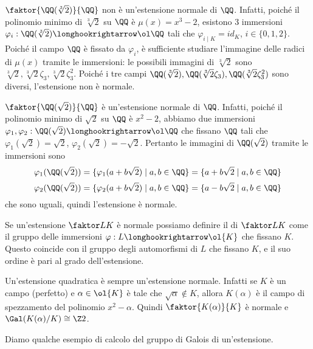\documentclass[11pt]{scrartcl}
\begin{document}
\begin{example}
    $\faktor{\QQ(\sqrt[3]{2})}{\QQ}$ non è un'estensione normale di $\QQ$.
    Infatti, poiché il polinomio minimo di $\sqrt[3]{2}$ su $\QQ$ è $\mu(x) = x^3 - 2$,
    esistono 3 immersioni $\varphi_i: \QQ(\sqrt[3]{2})\longhookrightarrow \ol\QQ$
    tali che $\varphi_{i\mid K} = id_K$, $i \in \{0, 1, 2\}$. Poiché il campo
    $\QQ$ è fissato da $\varphi_i$, è sufficiente studiare l'immagine delle
    radici di $\mu(x)$ tramite le immersioni: le possibili immagini di $\sqrt[3]{2}$
    sono $\sqrt[3]{2}, \sqrt[3]{2}\zeta_3, \sqrt[3]{2}\zeta_3^2$. Poiché i 
    tre campi $\QQ(\sqrt[3]{2}), \QQ(\sqrt[3]{2}\zeta_3), \QQ(\sqrt[3]{2}\zeta_3^2)$
    sono diversi, l'estensione non è normale.
\end{example}

\begin{example}
    $\faktor{\QQ(\sqrt{2})}{\QQ}$ è un'estensione normale di $\QQ$. Infatti,
    poiché il polinomio minimo di $\sqrt{2}$ su $\QQ$ è $x^2 - 2$, abbiamo 
    due immersioni $\varphi_1, \varphi_2:\QQ(\sqrt{2})\longhookrightarrow \ol\QQ$
    che fissano $\QQ$ tali che $\varphi_1(\sqrt{2}) = \sqrt{2}$, 
    $\varphi_2(\sqrt{2}) = -\sqrt{2}$. Pertanto le immagini di $\QQ(\sqrt 2)$
    tramite le immersioni sono
    \[
        \varphi_1(\QQ(\sqrt 2)) = \{\varphi_1(a + b\sqrt 2)\mid a, b \in \QQ\} = 
        \{a + b\sqrt 2\mid a, b \in \QQ\}
    \]
    \[
        \varphi_2(\QQ(\sqrt 2)) = \{\varphi_2(a + b\sqrt 2)\mid a, b \in \QQ\} = 
        \{a - b\sqrt 2 \mid a, b \in \QQ\}
    \]
    che sono uguali, quindi l'estensione è normale.
\end{example}

Se un'estensione $\faktor L K$ è normale possiamo definire il 
di $\faktor L K$ come il gruppo delle immersioni $\varphi:L\longhookrightarrow \ol{K}$
che fissano $K$. Questo coincide con il gruppo degli automorfismi di $L$
che fissano $K$, e il suo ordine è pari al grado dell'estensione.

\begin{remark}
    Un'estensione quadratica è sempre un'estensione normale. Infatti se $K$ 
    è un campo (perfetto) e $\alpha \in \ol{K}$ è tale che $\sqrt{\alpha}\notin K$,
    allora $K(\alpha)$ è il campo di spezzamento del polinomio $x^2 - \alpha$.
    Quindi $\faktor{K(\alpha)}{K}$ è normale e $\Gal(K(\alpha)/K) \cong \Z2$.
\end{remark}

Diamo qualche esempio di calcolo del gruppo di Galois di un'estensione.
\end{document}
